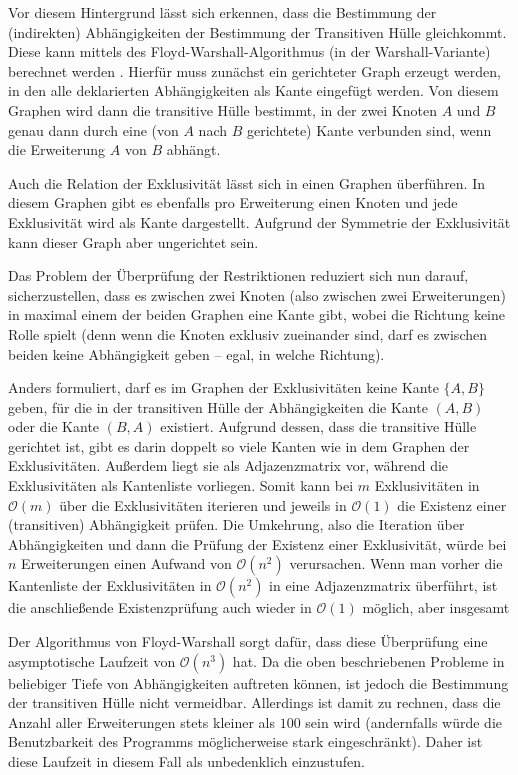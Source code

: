 Vor diesem Hintergrund lässt sich erkennen, dass die Bestimmung der (indirekten) Abhängigkeiten der Bestimmung der Transitiven Hülle gleichkommt. Diese kann mittels des Floyd-Warshall-Algorithmus (in der Warshall-Variante) berechnet werden \cite{warshal1_algorithm}. Hierfür muss zunächst ein gerichteter Graph erzeugt werden, in den alle deklarierten Abhängigkeiten als Kante eingefügt werden. Von diesem Graphen wird dann die transitive Hülle bestimmt, in der zwei Knoten $A$ und $B$ genau dann durch eine (von $A$ nach $B$ gerichtete) Kante verbunden sind, wenn die Erweiterung $A$ von $B$ abhängt.

Auch die Relation der Exklusivität lässt sich in einen Graphen überführen. In diesem Graphen gibt es ebenfalls pro Erweiterung einen Knoten und jede Exklusivität wird als Kante dargestellt. Aufgrund der Symmetrie der Exklusivität kann dieser Graph aber ungerichtet sein.

Das Problem der Überprüfung der Restriktionen reduziert sich nun darauf, sicherzustellen, dass es zwischen zwei Knoten (also zwischen zwei Erweiterungen) in maximal einem der beiden Graphen eine Kante gibt, wobei die Richtung keine Rolle spielt (denn wenn die Knoten exklusiv zueinander sind, darf es zwischen beiden keine Abhängigkeit geben -- egal, in welche Richtung).

Anders formuliert, darf es im Graphen der Exklusivitäten keine Kante $\{A, B\}$ geben, für die in der transitiven Hülle der Abhängigkeiten die Kante $(A, B)$ oder die Kante $(B, A)$ existiert. Aufgrund dessen, dass die transitive Hülle gerichtet ist, gibt es darin doppelt so viele Kanten wie in dem Graphen der Exklusivitäten. Außerdem liegt sie als Adjazenzmatrix vor, während die Exklusivitäten als Kantenliste vorliegen. Somit kann bei $m$ Exklusivitäten in $\mathcal{O}(m)$ über die Exklusivitäten iterieren und jeweils in $\mathcal{O}(1)$ die Existenz einer (transitiven) Abhängigkeit prüfen. Die Umkehrung, also die Iteration über Abhängigkeiten und dann die Prüfung der Existenz einer Exklusivität, würde bei $n$ Erweiterungen einen Aufwand von $\mathcal{O}(n^2)$ verursachen. Wenn man vorher die Kantenliste der Exklusivitäten in $\mathcal{O}(n^2)$ in eine Adjazenzmatrix überführt, ist die anschließende Existenzprüfung auch wieder in $\mathcal{O}(1)$ möglich, aber insgesamt

Der Algorithmus von Floyd-Warshall sorgt dafür, dass diese Überprüfung eine asymptotische Laufzeit von $\mathcal{O}(n^3)$ hat. Da die oben beschriebenen Probleme in beliebiger Tiefe von Abhängigkeiten auftreten können, ist jedoch die Bestimmung der transitiven Hülle nicht vermeidbar. Allerdings ist damit zu rechnen, dass die Anzahl aller Erweiterungen stets kleiner als $100$ sein wird (andernfalls würde die Benutzbarkeit des Programms möglicherweise stark eingeschränkt). Daher ist diese Laufzeit in diesem Fall als unbedenklich einzustufen.
